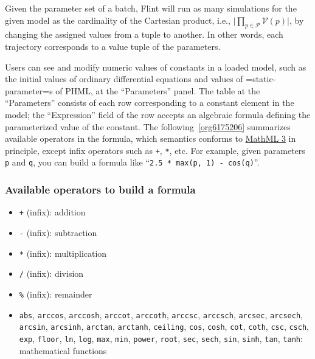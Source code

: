 \documentclass[a4paper,10pt]{report}
\begin{document}
Given the parameter set of a batch, Flint will run as many simulations for the
given model as the cardinality of the Cartesian product, i.e.,
\(\lvert \prod_{p \in \mathcal{P}} \mathcal{V}(p) \rvert\), by changing the
assigned values from a tuple to another.
In other words, each trajectory corresponds to a value tuple of the parameters.

Users can see and modify numeric values of constants in a loaded model,
such as the initial values of ordinary differential equations and values of
=static-parameter=s of PHML, at the ``Parameters'' panel.
The table at the ``Parameters'' consists of each row corresponding to a constant
element in the model; the ``Expression'' field of the row accepts an algebraic
formula defining the parameterized value of the constant.
The following~\ref{org6175206} summarizes available operators in
the formula, which semantics conforms to \href{https://www.w3.org/TR/MathML3/}{MathML 3} in principle,
except infix operators such as \texttt{+}, \texttt{*}, etc.
For example, given parameters \texttt{p} and \texttt{q}, you can build a formula
like ``\texttt{2.5 * max(p, 1) - cos(q)}''.

\subsubsection{\label{org6175206}Available operators to build a formula}
\label{sec:orgec79e3b}


\begin{itemize}
\item \texttt{+} (infix): addition
\item \texttt{-} (infix): subtraction
\item \texttt{*} (infix): multiplication
\item \texttt{/} (infix): division
\item \texttt{\%} (infix): remainder
\item \texttt{abs},
\texttt{arccos},
\texttt{arccosh},
\texttt{arccot},
\texttt{arccoth},
\texttt{arccsc},
\texttt{arccsch},
\texttt{arcsec},
\texttt{arcsech},
\texttt{arcsin},
\texttt{arcsinh},
\texttt{arctan},
\texttt{arctanh},
\texttt{ceiling},
\texttt{cos},
\texttt{cosh},
\texttt{cot},
\texttt{coth},
\texttt{csc},
\texttt{csch},
\texttt{exp},
\texttt{floor},
\texttt{ln},
\texttt{log},
\texttt{max},
\texttt{min},
\texttt{power},
\texttt{root},
\texttt{sec},
\texttt{sech},
\texttt{sin},
\texttt{sinh},
\texttt{tan},
\texttt{tanh}: mathematical functions
\end{itemize}
\end{document}
